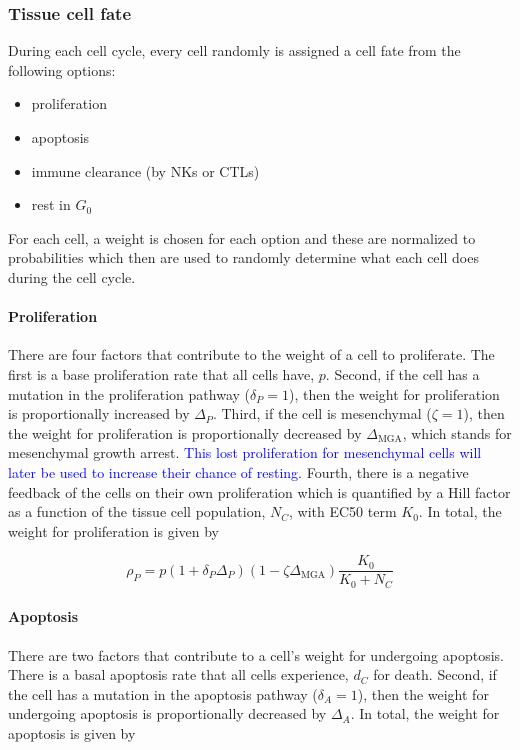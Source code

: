\documentclass[11pt]{article}
\newcommand{\tcb} { \textcolor{blue} }
\begin{document}
\subsubsection{Tissue cell fate}
During each cell cycle, every cell randomly is assigned a cell fate from the following options:
\begin{itemize}
\item proliferation
\item apoptosis
\item immune clearance (by NKs or CTLs)
\item rest in $G_0$
\end{itemize}

For each cell, a weight is chosen for each option and these are normalized to probabilities which then are used to randomly determine what each cell does during the cell cycle.

\paragraph{Proliferation}
There are four factors that contribute to the weight of a cell to proliferate.
The first is a base proliferation rate that all cells have, $p$.
Second, if the cell has a mutation in the proliferation pathway ($\delta_P=1$), then the weight for proliferation is proportionally increased by $\Delta_P$.
Third, if the cell is mesenchymal ($\zeta=1$), then the weight for proliferation is proportionally decreased by $\Delta_{\text{MGA}}$, which stands for mesenchymal growth arrest.
\tcb{This lost proliferation for mesenchymal cells will later be used to increase their chance of resting.}
Fourth, there is a negative feedback of the cells on their own proliferation which is quantified by a Hill factor as a function of the tissue cell population, $N_C$, with EC50 term $K_0$.
In total, the weight for proliferation is given by

\begin{equation}\tag{2.1}
\rho_P = p(1+\delta_{P}\Delta_P)(1-\zeta \Delta_{\text{MGA}})\frac{K_0}{K_0+N_C}
\end{equation}

\paragraph{Apoptosis}
There are two factors that contribute to a cell's weight for undergoing apoptosis.
There is a basal apoptosis rate that all cells experience, $d_C$ for death.
Second, if the cell has a mutation in the apoptosis pathway ($\delta_A=1$), then the weight for undergoing apoptosis is proportionally decreased by $\Delta_A$.
In total, the weight for apoptosis is given by 
\end{document}
